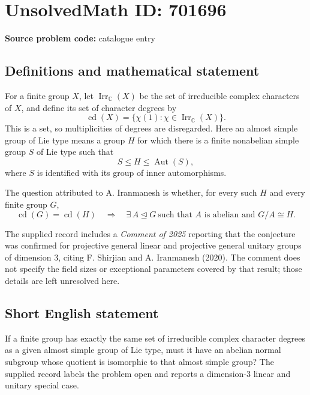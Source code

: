 \documentclass[11pt]{article}
\newcommand{\C}{\mathbb{C}}
\begin{document}
\section*{UnsolvedMath ID: 701696}
\textbf{Source problem code:} catalogue entry
\subsection{Definitions and mathematical statement}
For a finite group \(X\), let \(\operatorname{Irr}_{\C}(X)\) be the set of irreducible complex characters of \(X\), and define its set of character degrees by
\[
\operatorname{cd}(X)=\{\chi(1):\chi\in\operatorname{Irr}_{\C}(X)\}.
\]
This is a set, so multiplicities of degrees are disregarded. Here an almost simple group of Lie type means a group \(H\) for which there is a finite nonabelian simple group \(S\) of Lie type such that
\[
S\leq H\leq\operatorname{Aut}(S),
\]
where \(S\) is identified with its group of inner automorphisms.

The question attributed to A. Iranmanesh is whether, for every such \(H\) and every finite group \(G\),
\[
\operatorname{cd}(G)=\operatorname{cd}(H)
\quad\Longrightarrow\quad
\exists\,A\trianglelefteq G\ \text{such that }A\text{ is abelian and }G/A\cong H.
\]

The supplied record includes a \emph{Comment of 2025} reporting that the conjecture was confirmed for projective general linear and projective general unitary groups of dimension \(3\), citing F. Shirjian and A. Iranmanesh (2020). The comment does not specify the field sizes or exceptional parameters covered by that result; those details are left unresolved here.
\subsection{Short English statement}
If a finite group has exactly the same set of irreducible complex character degrees as a given almost simple group of Lie type, must it have an abelian normal subgroup whose quotient is isomorphic to that almost simple group? The supplied record labels the problem open and reports a dimension-\(3\) linear and unitary special case.
\end{document}
